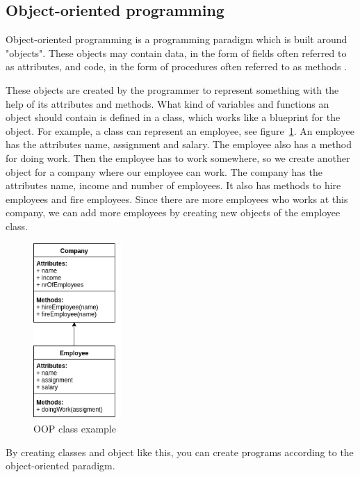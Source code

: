 \documentclass {article}
\begin{document}
\subsection{Object-oriented programming}
Object-oriented programming is a programming paradigm which is built around "objects". These objects may contain data, in the form of fields often referred to as attributes, and code, in the form of procedures often referred to as methods \cite{kindler}.

These objects are created by the programmer to represent something with the help of its attributes and methods. What kind of variables and functions an object should contain is defined in a class, which works like a blueprint for the object. For example, a class can represent an employee, see figure~\ref{fig:oop-example}. An employee has the attributes name, assignment and salary. The employee also has a method for doing work. Then the employee has to work somewhere, so we create another object for a company where our employee can work. The company has the attributes name, income and number of employees. It also has methods to hire employees and fire employees. Since there are more employees who works at this company, we can add more employees by creating new objects of the employee class.

\begin{figure}[H]
\centering
\includegraphics[width=0.3\textwidth]{oop-example}

\caption {OOP class example}
\label{fig:oop-example}
\end {figure}

By creating classes and object like this, you can create programs according to the object-oriented paradigm.
\end{document}
